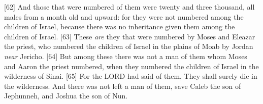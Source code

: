 [62] \textcolor[cmyk]{0.99998,1,0,0}{And those that were numbered of them were twenty and three thousand, all males from a month old and upward: for they were not numbered among the children of Israel, because there was no inheritance given them among the children of Israel.}
[63] \textcolor[cmyk]{0.99998,1,0,0}{These \emph{are} they that were numbered by Moses and Eleazar the priest, who numbered the children of Israel in the plains of Moab by Jordan \emph{near} Jericho.}
[64] \textcolor[cmyk]{0.99998,1,0,0}{But among these there was not a man of them whom Moses and Aaron the priest numbered, when they numbered the children of Israel in the wilderness of Sinai.}
[65] \textcolor[cmyk]{0.99998,1,0,0}{For the LORD had said of them, They shall surely die in the wilderness. And there was not left a man of them, save Caleb the son of Jephunneh, and Joshua the son of Nun.}
